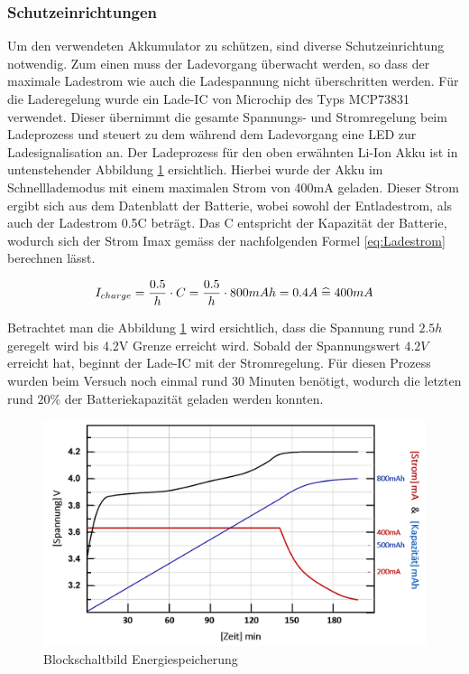 \subsubsection*{Schutzeinrichtungen}\label{sec:schutzeinrichtung}
Um den verwendeten Akkumulator zu schützen, sind diverse Schutzeinrichtung notwendig. Zum einen muss der Ladevorgang überwacht werden, so dass der maximale Ladestrom wie auch die Ladespannung nicht überschritten werden. Für die Laderegelung wurde ein Lade-IC von Microchip des Typs MCP73831 verwendet. Dieser übernimmt die gesamte Spannungs- und Stromregelung beim Ladeprozess und steuert zu dem während dem Ladevorgang eine LED zur Ladesignalisation an. Der Ladeprozess für den oben erwähnten Li-Ion Akku ist in untenstehender Abbildung  \ref{fig:Ladekurve Li-Ion Akku} ersichtlich. Hierbei wurde der Akku im Schnelllademodus mit einem maximalen Strom von 400mA geladen. Dieser Strom ergibt sich aus dem Datenblatt der Batterie, wobei sowohl der Entladestrom, als auch der Ladestrom 0.5C beträgt. Das C entspricht der Kapazität der Batterie, wodurch sich der Strom Imax gemäss der nachfolgenden Formel \ref{eq:Ladestrom} berechnen lässt.

\begin{equation}
\centering
I_{charge}={\frac{0.5}{h} \cdot C}={\frac{0.5}{h} \cdot 800mAh}=0.4A\thickspace \widehat {=} \thickspace 400mA
\label{eq:Ladestrom}
\end{equation}

Betrachtet man die Abbildung \ref{fig:Ladekurve Li-Ion Akku} wird ersichtlich, dass die Spannung rund $2.5h$ geregelt wird bis 4.2V Grenze erreicht wird. Sobald der Spannungswert $4.2V$ erreicht hat, beginnt der Lade-IC mit der Stromregelung. Für diesen Prozess wurden beim Versuch noch einmal rund 30 Minuten benötigt, wodurch die letzten rund $20\%$ der Batteriekapazität geladen werden konnten.

\begin{figure}[H]
	\begin{center}
		\includegraphics[width=120mm]{data/LadekurveLiIon.png}
		\caption[Blockschaltbild Energiespeicherung]{Blockschaltbild Energiespeicherung} %
		\label{fig:Ladekurve Li-Ion Akku}
	\end{center}
\end{figure}


